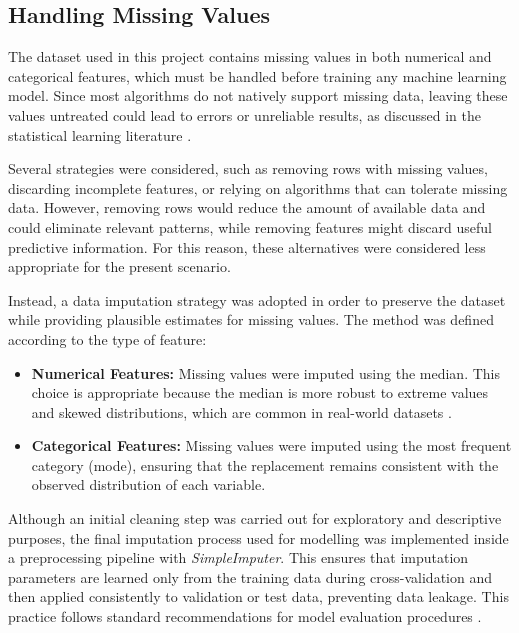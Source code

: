 \subsection{Handling Missing Values}

The dataset used in this project contains missing values in both numerical and categorical features, which must be handled before training any machine learning model. Since most algorithms do not natively support missing data, leaving these values untreated could lead to errors or unreliable results, as discussed in the statistical learning literature \cite{hastie2009overview}.

Several strategies were considered, such as removing rows with missing values, discarding incomplete features, or relying on algorithms that can tolerate missing data. However, removing rows would reduce the amount of available data and could eliminate relevant patterns, while removing features might discard useful predictive information. For this reason, these alternatives were considered less appropriate for the present scenario.

Instead, a data imputation strategy was adopted in order to preserve the dataset while providing plausible estimates for missing values. The method was defined according to the type of feature:

\begin{itemize}
    \item \textbf{Numerical Features:} Missing values were imputed using the median. This choice is appropriate because the median is more robust to extreme values and skewed distributions, which are common in real-world datasets \cite{hastie2009overview}.
    
    \item \textbf{Categorical Features:} Missing values were imputed using the most frequent category (mode), ensuring that the replacement remains consistent with the observed distribution of each variable.
\end{itemize}

Although an initial cleaning step was carried out for exploratory and descriptive purposes, the final imputation process used for modelling was implemented inside a preprocessing pipeline with \textit{SimpleImputer}. This ensures that imputation parameters are learned only from the training data during cross-validation and then applied consistently to validation or test data, preventing data leakage. This practice follows standard recommendations for model evaluation procedures \cite{hastie2009model_assessment}.

